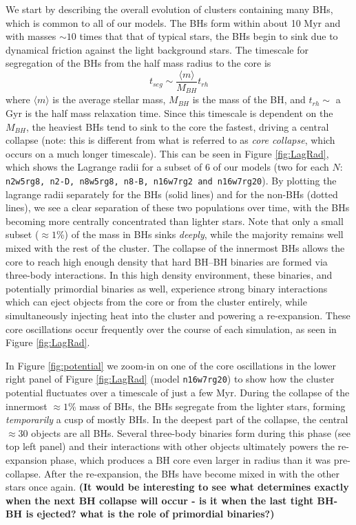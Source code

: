 \documentclass[12pt,preprint]{aastex}
\begin{document}
We start by describing the overall evolution of clusters containing many BHs, which 
is common to all of our models. The BHs form
within about 10 Myr and with masses $\sim 10$ times that that of typical stars, 
the BHs begin to sink due to dynamical friction against the light background stars. 
The timescale for segregation of the BHs from the half mass radius to the core is 
\begin{equation}
t_{seg} \sim \frac{\langle m \rangle}{M_{BH}} t_{rh}
\label{eq:segregation timescale}
\end{equation}
where $\langle m \rangle$ is the average stellar mass, $M_{BH}$ is the mass of the BH, 
and $t_{rh} \sim$ a Gyr is the half mass relaxation time. Since this timescale is dependent
on the $M_{BH}$, the heaviest BHs tend to sink to the core the fastest, driving a central collapse
(note: this is different from what is referred to as \emph{core collapse}, which occurs on a much longer
timescale). This can be seen in Figure \ref{fig:LagRad}, which shows the Lagrange radii
for a subset of 6 of our models (two for each $N$: \texttt{n2w5rg8, n2-D, n8w5rg8, n8-B, n16w7rg2 
and n16w7rg20}). By plotting the lagrange radii separately for the BHs (solid lines) 
and for the non-BHs (dotted lines), we see a clear separation of these two populations
over time, with the BHs becoming more centrally concentrated than lighter stars. 
Note that only a small subset ($\approx 1$\%) of the mass in BHs sinks \emph{deeply}, while the majority 
remains well mixed with the rest of the cluster. The collapse of the innermost BHs 
allows the core to reach high enough density that hard BH--BH binaries are formed
via three-body interactions. In this high density environment, these binaries, 
and potentially primordial binaries as well, experience strong binary interactions 
which can eject objects from the core or from the cluster entirely, while simultaneously injecting heat
into the cluster and powering a re-expansion. These core oscillations occur frequently
over the course of each simulation, as seen in Figure \ref{fig:LagRad}.

In Figure \ref{fig:potential} we zoom-in on one of the core oscillations in the lower right 
panel of Figure \ref{fig:LagRad} (model \texttt{n16w7rg20}) to show how the cluster potential
 fluctuates over a timescale of just a few Myr.
During the collapse of the innermost $\approx 1$\% mass of BHs,
the BHs segregate from the lighter stars, forming \emph{temporarily} a cusp of mostly BHs. 
In the deepest part of the collapse, the central $\approx 30$ objects are all BHs. Several 
three-body binaries form during this phase (see top left panel) and their interactions
with other objects ultimately powers the re-expansion phase, which produces a BH 
core even larger in radius than it was pre-collapse. 
After the re-expansion, the BHs have become mixed in with the other stars once again. 
\textbf{(It would be interesting to see what determines exactly when the next BH collapse
will occur - is it when the last tight BH-BH is ejected? what is the role of primordial binaries?)}
\end{document}
